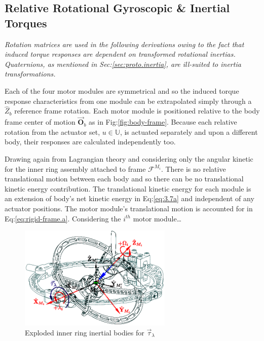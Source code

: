 \subsection{Relative Rotational Gyroscopic \& Inertial Torques}
\label{subsec:dynamics.nonlinearities.gyrotorques}
\emph{\color{gray}Rotation matrices are used in the following derivations owing to the fact that induced torque responses are dependent on transformed rotational inertias. Quaternions, as mentioned in Sec:\ref{sec:proto.inertia}, are ill-suited to inertia transformations.}
\par
Each of the four motor modules are symmetrical and so the induced torque response characteristics from one module can be extrapolated simply through a $\hat{Z}_b$ reference frame rotation. Each motor module is positioned relative to the body frame center of motion $\vec{\mathbf{O}}_b$ as in Fig:\ref{fig:body-frame}. Because each relative rotation from the actuator set, $u\in\mathbb{U}$, is actuated separately and upon a different body, their responses are calculated independently too.
\par
Drawing again from Lagrangian theory and considering only the angular kinetic for the inner ring assembly attached to frame $\mathcal{F}^{M_i}$. There is no relative translational motion between each body and so there can be no translational kinetic energy contribution. The translational kinetic energy for each module is an extension of body's net kinetic energy in Eq:\ref{eq:3.7a} and independent of any actuator positions. The motor module's translational motion is accounted for in Eq:\ref{eq:rigid-frame.a}. Considering the $i^{th}$ motor module\ldots
\begin{figure}[htbp]
\centering
\includegraphics[width=0.65\textwidth]{figs/response-inner}
\caption{Exploded inner ring inertial bodies for $\vec{\tau}_\lambda$}
\label{fig:response-inner}
\vspace{-12pt}
\end{figure}
